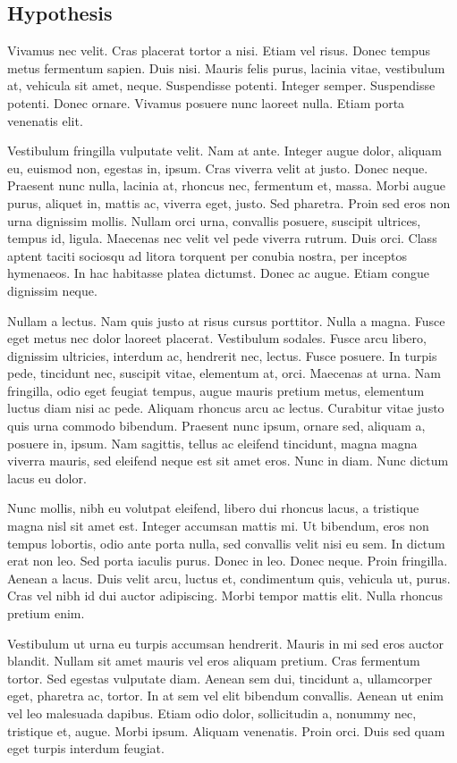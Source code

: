 \documentclass[12pt]{report}
\begin{document}
\subsection{Hypothesis}  

Vivamus nec velit. Cras placerat tortor a nisi. Etiam vel risus. Donec tempus metus fermentum sapien. Duis nisi. Mauris felis purus, lacinia vitae, vestibulum at, vehicula sit amet, neque. Suspendisse potenti. Integer semper. Suspendisse potenti. Donec ornare. Vivamus posuere nunc laoreet nulla. Etiam porta venenatis elit.

Vestibulum fringilla vulputate velit. Nam at ante. Integer augue dolor, aliquam eu, euismod non, egestas in, ipsum. Cras viverra velit at justo. Donec neque. Praesent nunc nulla, lacinia at, rhoncus nec, fermentum et, massa. Morbi augue purus, aliquet in, mattis ac, viverra eget, justo. Sed pharetra. Proin sed eros non urna dignissim mollis. Nullam orci urna, convallis posuere, suscipit ultrices, tempus id, ligula. Maecenas nec velit vel pede viverra rutrum. Duis orci. Class aptent taciti sociosqu ad litora torquent per conubia nostra, per inceptos hymenaeos. In hac habitasse platea dictumst. Donec ac augue. Etiam congue dignissim neque.

Nullam a lectus. Nam quis justo at risus cursus porttitor. Nulla a magna. Fusce eget metus nec dolor laoreet placerat. Vestibulum sodales. Fusce arcu libero, dignissim ultricies, interdum ac, hendrerit nec, lectus. Fusce posuere. In turpis pede, tincidunt nec, suscipit vitae, elementum at, orci. Maecenas at urna. Nam fringilla, odio eget feugiat tempus, augue mauris pretium metus, elementum luctus diam nisi ac pede. Aliquam rhoncus arcu ac lectus. Curabitur vitae justo quis urna commodo bibendum. Praesent nunc ipsum, ornare sed, aliquam a, posuere in, ipsum. Nam sagittis, tellus ac eleifend tincidunt, magna magna viverra mauris, sed eleifend neque est sit amet eros. Nunc in diam. Nunc dictum lacus eu dolor.

Nunc mollis, nibh eu volutpat eleifend, libero dui rhoncus lacus, a tristique magna nisl sit amet est. Integer accumsan mattis mi. Ut bibendum, eros non tempus lobortis, odio ante porta nulla, sed convallis velit nisi eu sem. In dictum erat non leo. Sed porta iaculis purus. Donec in leo. Donec neque. Proin fringilla. Aenean a lacus. Duis velit arcu, luctus et, condimentum quis, vehicula ut, purus. Cras vel nibh id dui auctor adipiscing. Morbi tempor mattis elit. Nulla rhoncus pretium enim.

Vestibulum ut urna eu turpis accumsan hendrerit. Mauris in mi sed eros auctor blandit. Nullam sit amet mauris vel eros aliquam pretium. Cras fermentum tortor. Sed egestas vulputate diam. Aenean sem dui, tincidunt a, ullamcorper eget, pharetra ac, tortor. In at sem vel elit bibendum convallis. Aenean ut enim vel leo malesuada dapibus. Etiam odio dolor, sollicitudin a, nonummy nec, tristique et, augue. Morbi ipsum. Aliquam venenatis. Proin orci. Duis sed quam eget turpis interdum feugiat.
\end{document}
